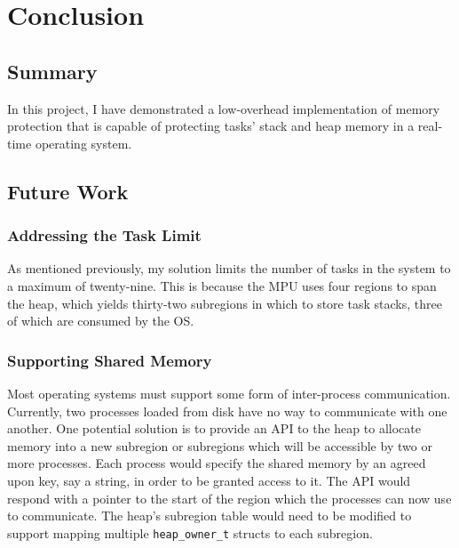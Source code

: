 
\chapter{Conclusion}

\section{Summary}

In this project, I have demonstrated a low-overhead implementation of memory protection that is capable of protecting tasks' stack and heap memory in a real-time operating system.

\section{Future Work}

\subsection{Addressing the Task Limit}

As mentioned previously, my solution limits the number of tasks in the system to a maximum of twenty-nine. This is because the MPU uses four regions to span the heap, which yields thirty-two subregions in which to store task stacks, three of which are consumed by the OS.

\subsection{Supporting Shared Memory}

Most operating systems must support some form of inter-process communication. Currently, two processes loaded from disk have no way to communicate with one another. One potential solution is to provide an API to the heap to allocate memory into a new subregion or subregions which will be accessible by two or more processes. Each process would specify the shared memory by an agreed upon key, say a string, in order to be granted access to it. The API would respond with a pointer to the start of the region which the processes can now use to communicate. The heap's subregion table would need to be modified to support mapping multiple \texttt{heap\_owner\_t} structs to each subregion.
